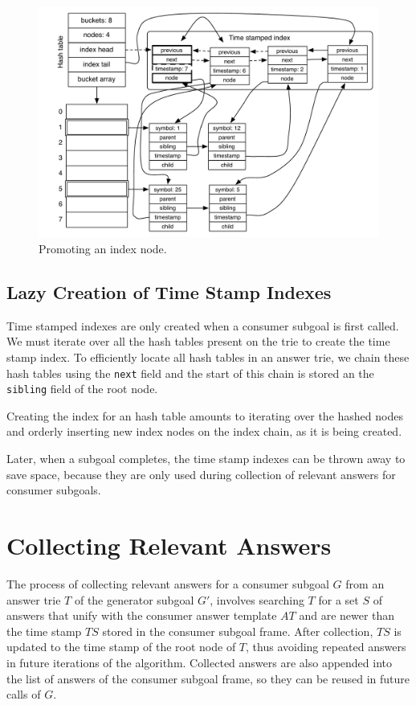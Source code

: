 \begin{figure}[ht]
  \centering
    \includegraphics[scale=0.6]{hash_table_promote.pdf}
  \caption{Promoting an index node.}
  \label{fig:hash_table_promote}
\end{figure}

\subsection{Lazy Creation of Time Stamp Indexes}

Time stamped indexes are only created when a consumer subgoal is first called.
We must iterate over all the hash tables present on the trie to create the time stamp index.
To efficiently locate all hash tables in an answer trie, we chain these hash tables
using the \texttt{next} field and the start of this chain is stored
an the \texttt{sibling} field of the root node.

Creating the index for an hash table amounts to iterating over the hashed nodes
and orderly inserting new index nodes on the index chain, as it is being created.

Later, when a subgoal completes, the time stamp indexes can be thrown away to save space,
because they are only used during collection of relevant answers
for consumer subgoals.

\section{Collecting Relevant Answers}\label{sec:collect}

The process of collecting relevant answers for a consumer subgoal $G$ from an answer trie $T$
of the generator subgoal $G'$, involves searching $T$ for a set $S$ of answers that unify
with the consumer answer template $AT$ and are newer than the time stamp
$TS$ stored in the consumer subgoal frame. After collection, $TS$ is updated to the
time stamp of the root node of $T$, thus avoiding repeated answers in future iterations
of the algorithm. Collected answers are also appended into the list of answers of the consumer
subgoal frame, so they can be reused in future calls of $G$.

